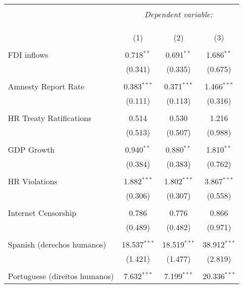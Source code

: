 
\begin{table}[!htbp] \centering 
  \caption{} 
  \label{} 
\begin{tabular}{@{\extracolsep{5pt}}lccc} 
\\[-1.8ex]\hline 
\hline \\[-1.8ex] 
 & \multicolumn{3}{c}{\textit{Dependent variable:}} \\ 
\cline{2-4} 
\\[-1.8ex] & \multicolumn{3}{c}{ } \\ 
\\[-1.8ex] & (1) & (2) & (3)\\ 
\hline \\[-1.8ex] 
 FDI inflows & 0.718$^{**}$ & 0.691$^{**}$ & 1.686$^{**}$ \\ 
  & (0.341) & (0.335) & (0.675) \\ 
  & & & \\ 
 Amnesty Report Rate & 0.383$^{***}$ & 0.371$^{***}$ & 1.466$^{***}$ \\ 
  & (0.111) & (0.113) & (0.316) \\ 
  & & & \\ 
 HR Treaty Ratifications & 0.514 & 0.530 & 1.216 \\ 
  & (0.513) & (0.507) & (0.988) \\ 
  & & & \\ 
 GDP Growth & 0.940$^{**}$ & 0.880$^{**}$ & 1.810$^{**}$ \\ 
  & (0.384) & (0.383) & (0.762) \\ 
  & & & \\ 
 HR Violations & 1.882$^{***}$ & 1.802$^{***}$ & 3.867$^{***}$ \\ 
  & (0.306) & (0.307) & (0.558) \\ 
  & & & \\ 
 Internet Censorship & 0.786 & 0.776 & 0.866 \\ 
  & (0.489) & (0.482) & (0.971) \\ 
  & & & \\ 
 Spanish (derechos humanos) & 18.537$^{***}$ & 18.519$^{***}$ & 38.912$^{***}$ \\ 
  & (1.421) & (1.477) & (2.819) \\ 
  & & & \\ 
 Portuguese (direitos humanos) & 7.632$^{***}$ & 7.199$^{***}$ & 20.336$^{***}$ \\ 

\end{tabular}
\end{table}
